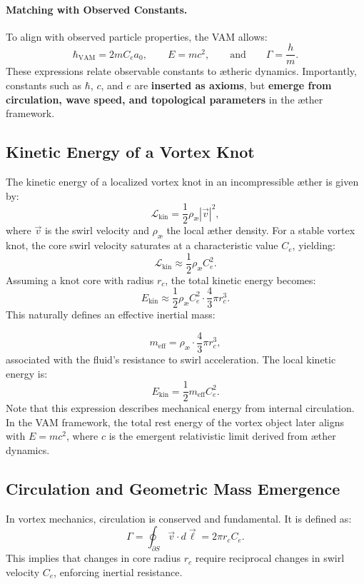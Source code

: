 \paragraph{Matching with Observed Constants.}
To align with observed particle properties, the VAM allows:
\[
    \hbar_{\text{VAM}} = 2 m C_e a_0, \qquad E = m c^2, \qquad \text{and} \qquad \Gamma = \frac{h}{m}.
\]
These expressions relate observable constants to ætheric dynamics. Importantly, constants such as \( \hbar \), \( c \), and \( e \) are \textbf{inserted as axioms}, but \textbf{emerge from circulation, wave speed, and topological parameters} in the æther framework.


\subsection{Kinetic Energy of a Vortex Knot}

The kinetic energy of a localized vortex knot in an incompressible æther is given by:
\begin{equation}
    \mathcal{L}_\text{kin} = \frac{1}{2} \rho_\text{\ae} |\vec{v}|^2,
\end{equation}
where $\vec{v}$ is the swirl velocity and $\rho_\text{\ae}$ the local æther density. For a stable vortex knot, the core swirl velocity saturates at a characteristic value \( C_e \), yielding:
\[
    \mathcal{L}_\text{kin} \approx \frac{1}{2} \rho_\text{\ae} C_e^2.
\]
Assuming a knot core with radius \( r_c \), the total kinetic energy becomes:
\[
    E_\text{kin} \approx \frac{1}{2} \rho_\text{\ae} C_e^2 \cdot \frac{4}{3} \pi r_c^3.
\]
This naturally defines an effective inertial mass:

\[
    m_\text{eff} = \rho_\text{\ae} \cdot \frac{4}{3} \pi r_c^3,
\]
associated with the fluid's resistance to swirl acceleration. The local kinetic energy is:
\[
    E_{\text{kin}} = \frac{1}{2} m_\text{eff} C_e^2.
\]
Note that this expression describes mechanical energy from internal circulation. In the VAM framework, the total rest energy of the vortex object later aligns with \( E = m c^2 \), where \( c \) is the emergent relativistic limit derived from æther dynamics.

\subsection{Circulation and Geometric Mass Emergence}

In vortex mechanics, circulation is conserved and fundamental. It is defined as:
\begin{equation}
    \Gamma = \oint_{\partial S} \vec{v} \cdot d\vec{\ell} = 2\pi r_c C_e.
\end{equation}
This implies that changes in core radius \( r_c \) require reciprocal changes in swirl velocity \( C_e \), enforcing inertial resistance.

